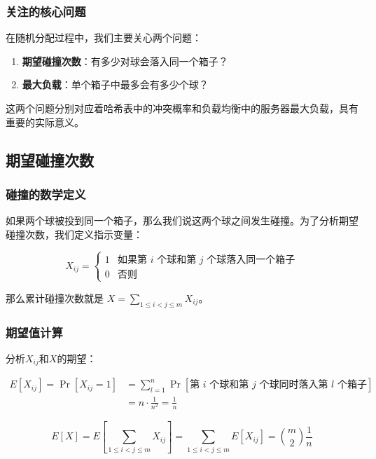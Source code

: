 \documentclass[lang=cn,newtx,10pt,scheme=chinese,chinesefont=nofont,citestyle=gb7714-2015, bibstyle=gb7714-2015]{elegantbook}
\begin{document}
\begin{refsection}
\subsubsection{关注的核心问题}
在随机分配过程中，我们主要关心两个问题：
\begin{enumerate}
\item \textbf{期望碰撞次数}：有多少对球会落入同一个箱子？
\item \textbf{最大负载}：单个箱子中最多会有多少个球？
\end{enumerate}

这两个问题分别对应着哈希表中的冲突概率和负载均衡中的服务器最大负载，具有重要的实际意义。

\subsection{期望碰撞次数}

\subsubsection{碰撞的数学定义}

如果两个球被投到同一个箱子，那么我们说这两个球之间发生碰撞。为了分析期望碰撞次数，我们定义指示变量：

\begin{equation*}
X_{ij} = \begin{cases}
1 & \text{如果第 $i$ 个球和第 $j$ 个球落入同一个箱子} \\ 
0 & \text{否则}
\end{cases}
\end{equation*}

那么累计碰撞次数就是 $X=\sum_{1\le i<j\le m}X_{ij}$。

\subsubsection{期望值计算}

分析$X_{ij}$和$X$的期望：

\begin{align*}
E[X_{ij}] = \Pr[X_{ij}=1] &= \sum_{l=1}^n\Pr[\text{第 $i$ 个球和第 $j$ 个球同时落入第 $l$ 个箱子}] \\
&= n\cdot \frac{1}{n^2} = \frac{1}{n}
\end{align*}

\begin{equation*}
E[X] = E\left[\sum_{1\le i< j\le m}X_{ij}\right] = \sum_{1\le i<j\le m}E[X_{ij}] = {\binom{m}{2}}\frac{1}{n}
\end{equation*}


\end{refsection}
\end{document}
